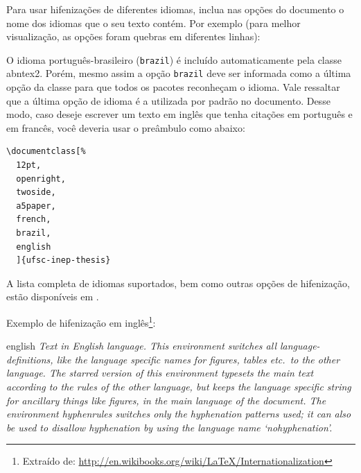 Para usar hifenizações de diferentes idiomas, inclua nas opções do documento o
nome dos idiomas que o seu texto contém. Por exemplo (para melhor
visualização, as opções foram quebras em diferentes linhas):


O idioma português-brasileiro (\texttt{brazil}) é incluído automaticamente pela
classe \textsf{abntex2}. Porém, mesmo assim a opção \texttt{brazil} deve ser
informada como a última opção da classe para que todos os pacotes reconheçam o
idioma. Vale ressaltar que a última opção de idioma é a utilizada por padrão no
documento. Desse modo, caso deseje escrever um texto em inglês que tenha
citações em português e em francês, você deveria usar o preâmbulo como abaixo:

\begin{verbatim}
\documentclass[%
  12pt,
  openright,
  twoside,
  a5paper,
  french,
  brazil,
  english
  ]{ufsc-inep-thesis}
\end{verbatim}

A lista completa de idiomas suportados, bem como outras opções de hifenização,
estão disponíveis em \textcite[p.~5-6]{babel}.

Exemplo de hifenização em inglês\footnote{Extraído de:
\url{http://en.wikibooks.org/wiki/LaTeX/Internationalization} }:

\begin{otherlanguage*}{english}
\textit{%
  Text in English language. This environment switches all
  language\hyp{}definitions, like the language specific names for figures,
  tables etc.\ to the other language. The starred version of this environment
  typesets the main text according to the rules of the other language, but
  keeps the language specific string for ancillary things like figures, in the
  main language of the document.  The environment hyphenrules switches only
  the hyphenation patterns used; it can also be used to disallow hyphenation
  by using the language name `nohyphenation'.
}
\end{otherlanguage*}


